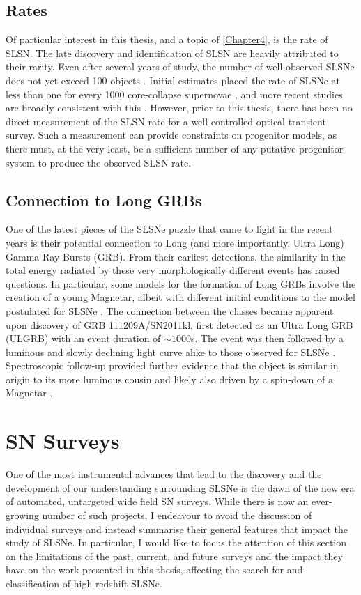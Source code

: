\subsection{Rates}
Of particular interest in this thesis, and a topic of \cref{Chapter4}, is the rate of SLSN. The late discovery and identification of SLSN are heavily attributed to their rarity. Even after several years of study, the number of well-observed SLSNe does not yet exceed 100 objects \citep[e.g., see compilations in][]{Inserra2014,Papadopoulos2015,Nicholl2015,DeCia2018}. Initial estimates placed the rate of SLSNe at less than one for every 1000 core-collapse supernovae \citep{Quimby2011}, and more recent studies are broadly consistent with this \citep{Quimby2013,McCrum2014}. However, prior to this thesis, there has been no direct measurement of the SLSN rate for a well-controlled optical transient survey. Such a measurement can provide constraints on progenitor models, as there must, at the very least, be a sufficient number of any putative progenitor system to produce the observed SLSN rate.

\subsection{Connection to Long GRBs}
One of the latest pieces of the SLSNe puzzle that came to light in the recent years is their potential connection to Long (and more importantly, Ultra Long) Gamma Ray Bursts (GRB). From their earliest detections, the similarity in the total energy radiated by these very morphologically different events has raised questions. In particular, some models for the formation of Long GRBs involve the creation of a young Magnetar, albeit with different initial conditions to the model postulated for SLSNe \citep{Margalit2018}. The connection between the classes became apparent upon discovery of GRB 111209A/SN2011kl, first detected as an Ultra Long GRB (ULGRB) with an event duration of $\sim1000$s. The event was then followed by a luminous and slowly declining light curve alike to those observed for SLSNe \citep{Greiner2015}. Spectroscopic follow-up provided further evidence that the object is similar in origin to its more luminous cousin \citep{Mazzali2015} and likely also driven by a spin-down of a Magnetar \citep{Metzger2015}.

\section{SN Surveys}
One of the most instrumental advances that lead to the discovery and the development of our understanding surrounding SLSNe is the dawn of the new era of automated, untargeted wide field SN surveys. While there is now an ever-growing number of such projects, I endeavour to avoid the discussion of individual surveys and instead summarise their general features that impact the study of SLSNe. In particular, I would like to focus the attention of this section on the limitations of the past, current, and future surveys and the impact they have on the work presented in this thesis, affecting the search for and classification of high redshift SLSNe.

